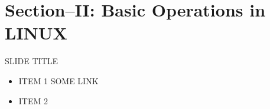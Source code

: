 

\maketitle
\section{Section--II: Basic Operations in LINUX	}
\begin{frame}[t]{SLIDE TITLE}
    \begin{itemize}
      \item ITEM 1
      SOME LINK
      \item ITEM 2
    \end{itemize}
\end{frame}



